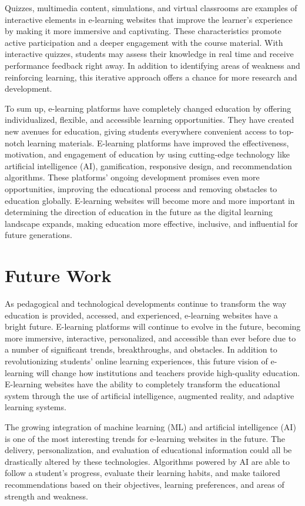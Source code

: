 \documentclass[BTech]{audiss}
\begin{document}
Quizzes, multimedia content, simulations, and virtual classrooms are examples of interactive elements in e-learning websites that improve the learner's experience by making it more immersive and captivating. These characteristics promote active participation and a deeper engagement with the course material. With interactive quizzes, students may assess their knowledge in real time and receive performance feedback right away. In addition to identifying areas of weakness and reinforcing learning, this iterative approach offers a chance for more research and development.

To sum up, e-learning platforms have completely changed education by offering individualized, flexible, and accessible learning opportunities. They have created new avenues for education, giving students everywhere convenient access to top-notch learning materials. E-learning platforms have improved the effectiveness, motivation, and engagement of education by using cutting-edge technology like artificial intelligence (AI), gamification, responsive design, and recommendation algorithms. These platforms' ongoing development promises even more opportunities, improving the educational process and removing obstacles to education globally. E-learning websites will become more and more important in determining the direction of education in the future as the digital learning landscape expands, making education more effective, inclusive, and influential for future generations.

\section{Future Work}
As pedagogical and technological developments continue to transform the way education is provided, accessed, and experienced, e-learning websites have a bright future. E-learning platforms will continue to evolve in the future, becoming more immersive, interactive, personalized, and accessible than ever before due to a number of significant trends, breakthroughs, and obstacles. In addition to revolutionizing students' online learning experiences, this future vision of e-learning will change how institutions and teachers provide high-quality education. E-learning websites have the ability to completely transform the educational system through the use of artificial intelligence, augmented reality, and adaptive learning systems.

The growing integration of machine learning (ML) and artificial intelligence (AI) is one of the most interesting trends for e-learning websites in the future. The delivery, personalization, and evaluation of educational information could all be drastically altered by these technologies. Algorithms powered by AI are able to follow a student's progress, evaluate their learning habits, and make tailored recommendations based on their objectives, learning preferences, and areas of strength and weakness.
\end{document}
